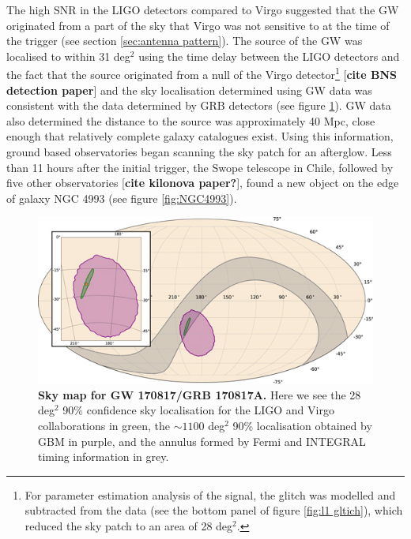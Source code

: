 \documentclass[11pt]{cuthesis}
\begin{document}
The high SNR in the LIGO detectors compared to Virgo suggested that the GW originated from a part of the sky that Virgo was not sensitive to at the time of the trigger (see section \ref{sec:antenna pattern}). The source of the GW was localised to within 31 deg$^2$ using the time delay between the LIGO detectors and the fact that the source originated from a null of the Virgo detector\footnote{For parameter estimation analysis of the signal, the glitch was modelled and subtracted from the data (see the bottom panel of figure \ref{fig:l1 gltich}), which reduced the sky patch to an area of 28 deg$^2$.} [\textbf{cite BNS detection paper}] and the sky localisation determined using GW data was consistent with the data determined by GRB detectors (see figure \ref{fig:170817 skymap}). GW data also determined the distance to the source was approximately 40 Mpc, close enough that relatively complete galaxy catalogues exist. Using this information, ground based observatories began scanning the sky patch for an afterglow. Less than 11 hours after the initial trigger, the Swope telescope in Chile, followed by five other observatories  [\textbf{cite kilonova paper?}], found a new object on the edge of galaxy NGC 4993 (see figure \ref{fig:NGC4993}). 


\begin{figure} %
\begin{center}
\includegraphics[width=0.8\linewidth]{gw-grb-170817-sky-map.jpg}
\end{center}
\caption{\textbf{Sky map for GW 170817/GRB 170817A.} Here we see the 28 deg$^2$ 90\% confidence sky localisation for the LIGO and Virgo collaborations in green, the $\sim1100$ deg$^2$ \cite{grb170817a_mm} 90\% localisation obtained by GBM in purple, and the annulus formed by Fermi and INTEGRAL timing information in grey.  \cite{GW170817_GRB} }
\label{fig:170817 skymap}
\end{figure}
\end{document}

